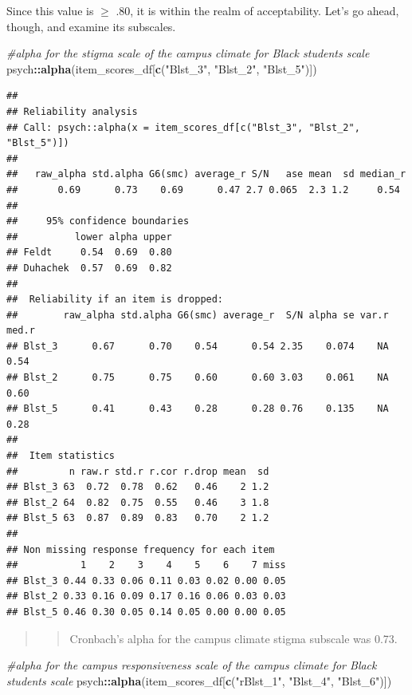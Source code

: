 \documentclass[
  11pt,
]{book}
\newenvironment{Shaded}{\begin{snugshade}}{\end{snugshade}}
\newcommand{\CommentTok}[1]{\textcolor[rgb]{0.37,0.37,0.37}{\textit{#1}}}
\newcommand{\FunctionTok}[1]{\textcolor[rgb]{0.27,0.27,0.27}{\textbf{#1}}}
\newcommand{\NormalTok}[1]{#1}
\newcommand{\SpecialCharTok}[1]{\textcolor[rgb]{0.43,0.43,0.43}{\textbf{#1}}}
\newcommand{\StringTok}[1]{\textcolor[rgb]{0.5,0.5,0.5}{#1}}
\begin{document}
Since this value is \(\geq\) .80, it is within the realm of acceptability. Let's go ahead, though, and examine its subscales.

\begin{Shaded}
\begin{Highlighting}[]
\CommentTok{\#alpha for the stigma scale of the campus climate for Black students scale}
\NormalTok{psych}\SpecialCharTok{::}\FunctionTok{alpha}\NormalTok{(item\_scores\_df[}\FunctionTok{c}\NormalTok{(}\StringTok{"Blst\_3"}\NormalTok{, }\StringTok{"Blst\_2"}\NormalTok{, }\StringTok{"Blst\_5"}\NormalTok{)])}
\end{Highlighting}
\end{Shaded}

\begin{verbatim}
## 
## Reliability analysis   
## Call: psych::alpha(x = item_scores_df[c("Blst_3", "Blst_2", "Blst_5")])
## 
##   raw_alpha std.alpha G6(smc) average_r S/N   ase mean  sd median_r
##       0.69      0.73    0.69      0.47 2.7 0.065  2.3 1.2     0.54
## 
##     95% confidence boundaries 
##          lower alpha upper
## Feldt     0.54  0.69  0.80
## Duhachek  0.57  0.69  0.82
## 
##  Reliability if an item is dropped:
##        raw_alpha std.alpha G6(smc) average_r  S/N alpha se var.r med.r
## Blst_3      0.67      0.70    0.54      0.54 2.35    0.074    NA  0.54
## Blst_2      0.75      0.75    0.60      0.60 3.03    0.061    NA  0.60
## Blst_5      0.41      0.43    0.28      0.28 0.76    0.135    NA  0.28
## 
##  Item statistics 
##         n raw.r std.r r.cor r.drop mean  sd
## Blst_3 63  0.72  0.78  0.62   0.46    2 1.2
## Blst_2 64  0.82  0.75  0.55   0.46    3 1.8
## Blst_5 63  0.87  0.89  0.83   0.70    2 1.2
## 
## Non missing response frequency for each item
##           1    2    3    4    5    6    7 miss
## Blst_3 0.44 0.33 0.06 0.11 0.03 0.02 0.00 0.05
## Blst_2 0.33 0.16 0.09 0.17 0.16 0.06 0.03 0.03
## Blst_5 0.46 0.30 0.05 0.14 0.05 0.00 0.00 0.05
\end{verbatim}

\begin{quote}
\begin{quote}
Cronbach's alpha for the campus climate stigma subscale was 0.73.
\end{quote}
\end{quote}

\begin{Shaded}
\begin{Highlighting}[]
\CommentTok{\#alpha for the campus responsiveness scale of the campus climate for Black students scale}
\NormalTok{psych}\SpecialCharTok{::}\FunctionTok{alpha}\NormalTok{(item\_scores\_df[}\FunctionTok{c}\NormalTok{(}\StringTok{"rBlst\_1"}\NormalTok{, }\StringTok{"Blst\_4"}\NormalTok{, }\StringTok{"Blst\_6"}\NormalTok{)])}
\end{Highlighting}
\end{Shaded}
\end{document}
